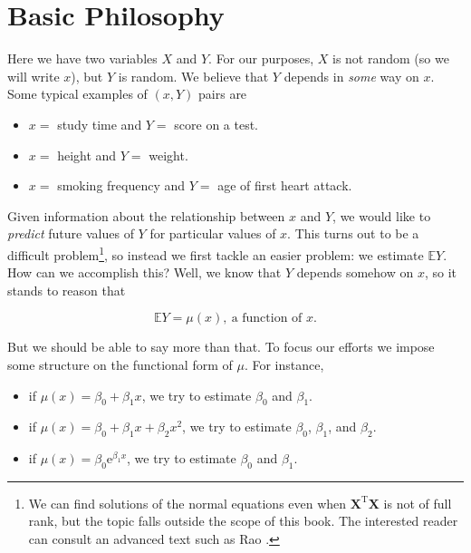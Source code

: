 \documentclass[]{book}
\providecommand{\tightlist}{%
  \setlength{\itemsep}{0pt}\setlength{\parskip}{0pt}}
\let\rmarkdownfootnote\footnote%
\def\footnote{\protect\rmarkdownfootnote}
\numberwithin{equation}{chapter}
\numberwithin{figure}{chapter}
\theoremstyle{plain}
\theoremstyle{definition}
\theoremstyle{remark}
\theoremstyle{definition}
\theoremstyle{definition}
\theoremstyle{remark}
\begin{document}
\section{Basic Philosophy}\label{sec-basic-philosophy}

Here we have two variables \(X\) and \(Y\). For our purposes, \(X\) is
not random (so we will write \(x\)), but \(Y\) is random. We believe
that \(Y\) depends in \emph{some} way on \(x\). Some typical examples of
\((x,Y)\) pairs are

\begin{itemize}
\tightlist
\item
  \(x =\) study time and \(Y =\) score on a test.
\item
  \(x =\) height and \(Y =\) weight.
\item
  \(x =\) smoking frequency and \(Y =\) age of first heart attack.
\end{itemize}

Given information about the relationship between \(x\) and \(Y\), we
would like to \emph{predict} future values of \(Y\) for particular
values of \(x\). This turns out to be a difficult problem\footnote{We
  can find solutions of the normal equations even when
  \(\mathbf{X}^{\mathrm{T}}\mathbf{X}\) is not of full rank, but the
  topic falls outside the scope of this book. The interested reader can
  consult an advanced text such as Rao \autocite{Rao1999}.}, so instead
we first tackle an easier problem: we estimate \(\mathbb{E}Y\). How can
we accomplish this? Well, we know that \(Y\) depends somehow on \(x\),
so it stands to reason that

\begin{equation}
\mathbb{E} Y = \mu(x),\ \mbox{a function of }x.
\end{equation}

But we should be able to say more than that. To focus our efforts we
impose some structure on the functional form of \(\mu\). For instance,

\begin{itemize}
\tightlist
\item
  if \(\mu(x)=\beta_{0}+\beta_{1}x\), we try to estimate \(\beta_{0}\)
  and \(\beta_{1}\).
\item
  if \(\mu(x) = \beta_{0} + \beta_{1}x + \beta_{2}x^{2}\), we try to
  estimate \(\beta_{0}\), \(\beta_{1}\), and \(\beta_{2}\).
\item
  if \(\mu(x) = \beta_{0} \mathrm{e}^{\beta_{1}x}\), we try to estimate
  \(\beta_{0}\) and \(\beta_{1}\).
\end{itemize}
\end{document}
